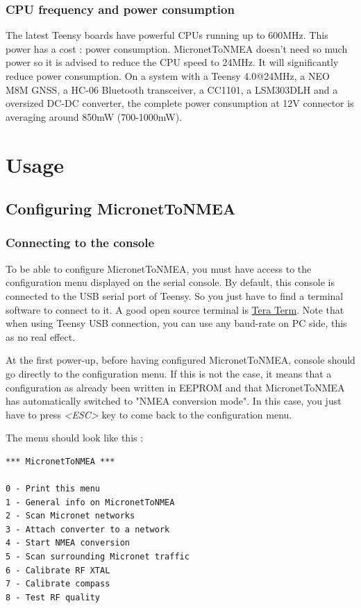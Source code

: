 \documentclass{report}
\begin{document}
\subsection{CPU frequency and power consumption}
The latest Teensy boards have powerful CPUs running up to 600MHz. This power has a cost : power consumption. MicronetToNMEA doesn't need so much power so it is advised to reduce the CPU speed to 24MHz. It will significantly reduce power consumption.
On a system with a Teensy 4.0@24MHz, a NEO M8M GNSS, a HC-06 Bluetooth transceiver, a CC1101, a LSM303DLH and a oversized DC-DC converter, the complete power consumption at 12V connector is averaging around 850mW (700-1000mW).

\chapter{Usage}

\section{Configuring MicronetToNMEA}

\subsection{Connecting to the console}

To be able to configure MicronetToNMEA, you must have access to the configuration menu displayed on the serial console. By default, this console is connected to the USB serial port of Teensy. So you just have to find a terminal software to connect to it. A good open source terminal is \href{http://www.teraterm.org/}{Tera Term}. Note that when using Teensy USB connection, you can use any baud-rate on PC side, this as no real effect.

At the first power-up, before having configured MicronetToNMEA, console should go directly to the configuration menu. If this is not the case, it means that a configuration as already been written in EEPROM and that MicronetToNMEA has automatically switched to "NMEA conversion mode". In this case, you just have to press \emph{<ESC>} key to come back to the configuration menu.

The menu should look like this :

\begin{verbatim}
*** MicronetToNMEA ***

0 - Print this menu
1 - General info on MicronetToNMEA
2 - Scan Micronet networks
3 - Attach converter to a network
4 - Start NMEA conversion
5 - Scan surrounding Micronet traffic
6 - Calibrate RF XTAL
7 - Calibrate compass
8 - Test RF quality
\end{verbatim}
\end{document}
